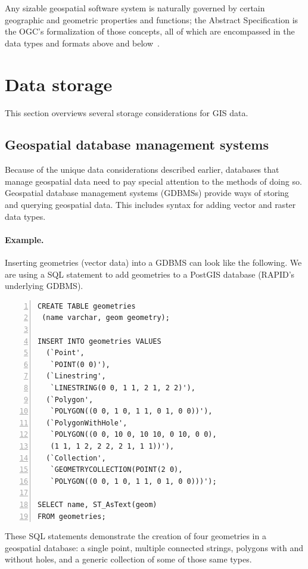 Any sizable geospatial software system is naturally governed by certain geographic and geometric properties and functions; the Abstract Specification is the OGC's formalization of those concepts, all of which are encompassed in the data types and formats above and below~\cite{AbstractSpecFaq}.

\section{Data storage}
\label{storage}
This section overviews several storage considerations for GIS data.

\subsection{Geospatial database management systems}
Because of the unique data considerations described earlier, databases that manage geospatial data need to pay special attention to the methods of doing so. Geospatial database management systems (GDBMSs) provide ways of storing and querying geospatial data. This includes syntax for adding vector and raster data types.

\paragraph{Example.}
\label{background_wkt}
Inserting geometries (vector data) into a GDBMS can look like the following. We are using a SQL statement to add geometries to a PostGIS database (RAPID's underlying GDBMS).

\begin{Verbatim}[samepage=true,baselinestretch=1,numbers=left,xleftmargin=12mm]
CREATE TABLE geometries
 (name varchar, geom geometry);

INSERT INTO geometries VALUES
  (`Point',
   `POINT(0 0)'),
  (`Linestring',
   `LINESTRING(0 0, 1 1, 2 1, 2 2)'),
  (`Polygon',
   `POLYGON((0 0, 1 0, 1 1, 0 1, 0 0))'),
  (`PolygonWithHole',
   `POLYGON((0 0, 10 0, 10 10, 0 10, 0 0),
   (1 1, 1 2, 2 2, 2 1, 1 1))'),
  (`Collection',
   `GEOMETRYCOLLECTION(POINT(2 0),
   `POLYGON((0 0, 1 0, 1 1, 0 1, 0 0)))');

SELECT name, ST_AsText(geom)
FROM geometries;
\end{Verbatim}

These SQL statements demonstrate the creation of four geometries in a geospatial database: a single point, multiple connected strings, polygons with and without holes, and a generic collection of some of those same types.

